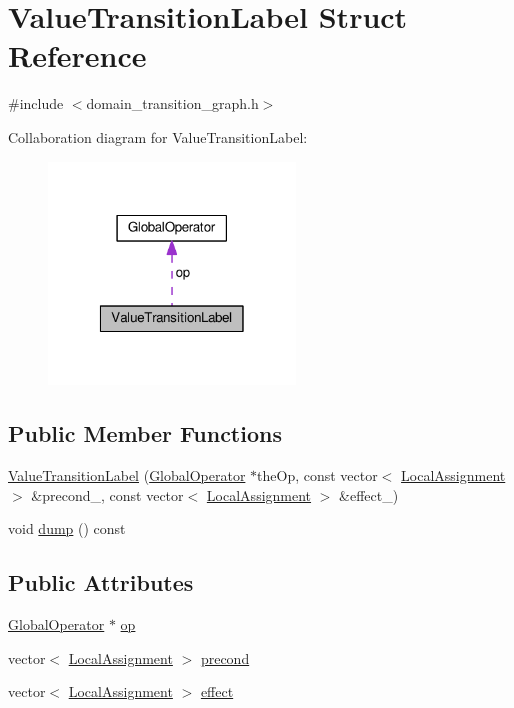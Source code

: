 \hypertarget{structValueTransitionLabel}{\section{Value\-Transition\-Label Struct Reference}
\label{structValueTransitionLabel}
}


{\ttfamily \#include $<$domain\-\_\-transition\-\_\-graph.\-h$>$}



Collaboration diagram for Value\-Transition\-Label\-:
\nopagebreak
\begin{figure}[H]
\begin{center}
\leavevmode
\includegraphics[width=186pt]{structValueTransitionLabel__coll__graph}
\end{center}
\end{figure}
\subsection*{Public Member Functions}
\begin{DoxyCompactItemize}
\item 
\hyperlink{structValueTransitionLabel_ae64bb0cd3fd181d966fdeab3a9a2e860}{Value\-Transition\-Label} (\hyperlink{classGlobalOperator}{Global\-Operator} $\ast$the\-Op, const vector$<$ \hyperlink{structLocalAssignment}{Local\-Assignment} $>$ \&precond\-\_\-, const vector$<$ \hyperlink{structLocalAssignment}{Local\-Assignment} $>$ \&effect\-\_\-)
\item 
void \hyperlink{structValueTransitionLabel_a040461f3e6bc642f30b37f0c7e8afad7}{dump} () const 
\end{DoxyCompactItemize}
\subsection*{Public Attributes}
\begin{DoxyCompactItemize}
\item 
\hyperlink{classGlobalOperator}{Global\-Operator} $\ast$ \hyperlink{structValueTransitionLabel_aca6a9593c0edcdccbb3cfbf1b05ab6e6}{op}
\item 
vector$<$ \hyperlink{structLocalAssignment}{Local\-Assignment} $>$ \hyperlink{structValueTransitionLabel_a523b4e337d6a7eb2db8e74932dae57f9}{precond}
\item 
vector$<$ \hyperlink{structLocalAssignment}{Local\-Assignment} $>$ \hyperlink{structValueTransitionLabel_ab1874d03f64a1fa7aa681c3d17df0d78}{effect}
\end{DoxyCompactItemize}


